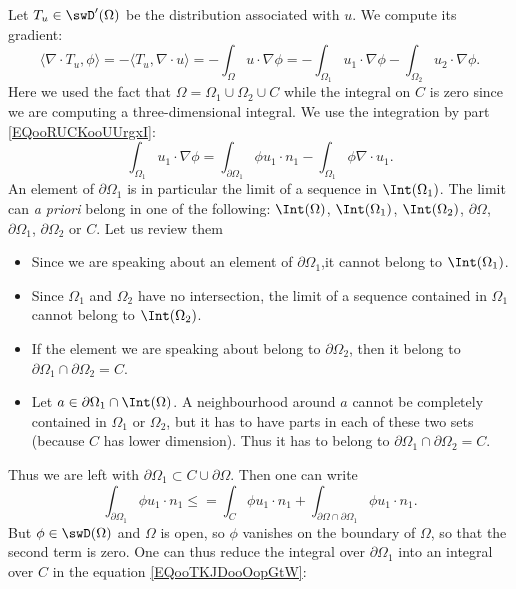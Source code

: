 Let \( T_u\in \swD'(\Omega)\) be the distribution associated with \( u\). We compute its gradient:
\begin{equation}
    \langle \nabla\cdot T_u, \phi\rangle =-\langle T_u, \nabla\cdot u\rangle =-\int_{\Omega}u\cdot\nabla \phi=-\int_{\Omega_1}u_1\cdot \nabla \phi-\int_{\Omega_2}u_2\cdot \nabla \phi.
\end{equation}
Here we used the fact that \( \Omega=\Omega_1\cup \Omega_2\cup C\) while the integral on \( C\) is zero since we are computing a three-dimensional integral. We use the integration by part \eqref{EQooRUCKooUUrgxI}:
\begin{equation}        \label{EQooTKJDooOopGtW}
    \int_{\Omega_1}u_1\cdot \nabla\phi=\int_{\partial \Omega_1}\phi u_1\cdot n_1-\int_{\Omega_1}\phi\nabla\cdot u_1.
\end{equation}
An element of \( \partial \Omega_1\) is in particular the limit of a sequence in \( \Int(\Omega_1)\). The limit can \emph{a priori} belong in one of the following: \( \Int(\Omega)\), \( \Int(\Omega_1)\), \( \Int(\Omega_2)\), \( \partial \Omega\), \( \partial \Omega_1\), \( \partial\Omega_2\) or \( C\). Let us review them
\begin{itemize}
    \item Since we are speaking about an element of \( \partial\Omega_1\),it cannot belong to \( \Int(\Omega_1)\).
    \item Since \( \Omega_1\) and \( \Omega_2\) have no intersection, the limit of a sequence contained in \( \Omega_1\) cannot belong to \( \Int(\Omega_2)\).
    \item If the element we are speaking about belong to \( \partial \Omega_2\), then it belong to \( \partial\Omega_1\cap\partial\Omega_2=C\).
    \item Let \( a\in\partial \Omega_1\cap \Int(\Omega)\). A neighbourhood around \( a\) cannot be completely contained in \( \Omega_1\) or \( \Omega_2\), but it has to have parts in each of these two sets (because \( C\) has lower dimension). Thus it has to belong to \( \partial \Omega_1\cap\partial\Omega_2=C\).
\end{itemize}
Thus we are left with \( \partial\Omega_1\subset C\cup\partial\Omega\). Then one can write
\begin{equation}
    \int_{\partial \Omega_1}\phi u_1\cdot n_1\leq =\int_{C}\phi u_1\cdot n_1+\int_{\partial \Omega\cap\partial\Omega_1}\phi u_1\cdot n_1.
\end{equation}
But \( \phi\in \swD(\Omega)\) and \( \Omega\) is open, so \( \phi\) vanishes on the boundary of \( \Omega\), so that the second term is zero. One can thus reduce the integral over \( \partial\Omega_1\) into an integral over \( C\) in the equation \eqref{EQooTKJDooOopGtW}:
